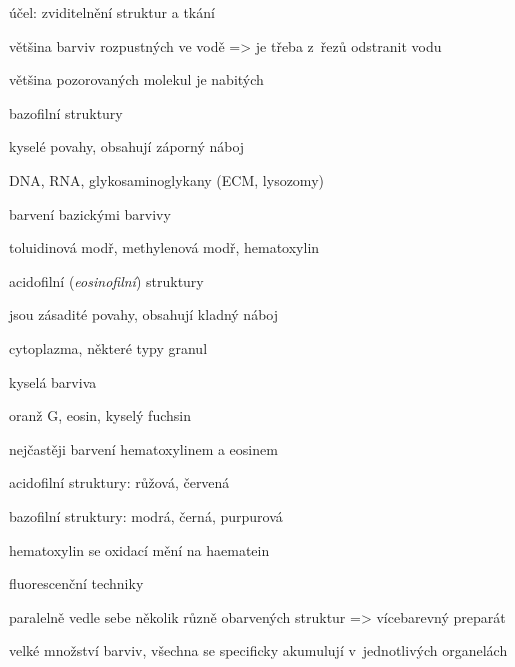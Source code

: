 \documentclass[DIV=8]{scrreprt}
\begin{document}
\begin{myItemize}[nosep]
    \item účel: zviditelnění struktur a tkání
    \item většina barviv rozpustných ve vodě => je třeba z řezů odstranit vodu
    \item většina pozorovaných molekul je nabitých
\begin{myItemize}[nosep]
    \item bazofilní struktury
\begin{myItemize}[nosep]
    \item kyselé povahy, obsahují záporný náboj
    \item DNA, RNA, glykosaminoglykany (ECM, lysozomy)
    \item barvení bazickými barvivy
\begin{myItemize}[nosep]
    \item toluidinová modř, methylenová modř, hematoxylin
\end{myItemize}

\end{myItemize}

    \item acidofilní (\emph{eosinofilní}) struktury
\begin{myItemize}[nosep]
    \item jsou zásadité povahy, obsahují kladný náboj
    \item cytoplazma, některé typy granul
    \item kyselá barviva
\begin{myItemize}[nosep]
    \item oranž G, eosin, kyselý fuchsin
\end{myItemize}

\end{myItemize}

\end{myItemize}

    \item nejčastěji barvení hematoxylinem a eosinem
\begin{myItemize}[nosep]
    \item acidofilní struktury: růžová, červená
    \item bazofilní struktury: modrá, černá, purpurová
\begin{myItemize}[nosep]
    \item hematoxylin se oxidací mění na haematein
\end{myItemize}

\end{myItemize}

    \item fluorescenční techniky
\begin{myItemize}[nosep]
    \item paralelně vedle sebe několik různě obarvených struktur => vícebarevný preparát
    \item velké množství barviv, všechna se specificky akumulují v jednotlivých organelách
\end{myItemize}

\end{myItemize}
\end{document}
